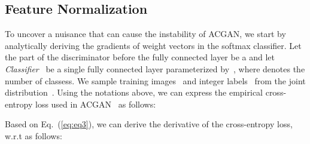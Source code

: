 \documentclass{article}
\begin{document}
\subsection{Feature Normalization}
\label{sec:Feature_Normalize}
 To uncover a nuisance that can cause the instability of ACGAN, we start by analytically deriving the gradients of weight vectors in the softmax classifier. Let the part of the discriminator before the fully connected layer be a  and let \emph{Classifier}~ be a single fully connected layer parameterized by~, where  denotes the number of classess. We sample training images~ and integer labels~ from the joint distribution~. Using the notations above, we can express the empirical cross-entropy loss used in ACGAN~\cite{Odena2017ConditionalIS} as follows:

Based on Eq.~(\ref{eq:eq3}), we can derive the derivative of the cross-entropy loss, w.r.t  as follows:
\end{document}

